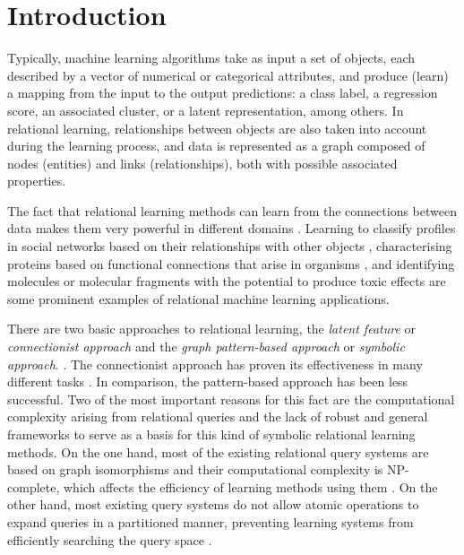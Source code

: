 \documentclass{article}%
\begin{document}
%
\normalsize%
\clearpage%
\section{Introduction}

Typically, machine learning algorithms take as input a set of objects, each described by a vector of numerical or categorical attributes, and produce (learn) a mapping from the input to the output predictions: a class label, a regression score, an associated cluster, or a latent representation, among others. In relational learning, relationships between objects are also taken into account during the learning process, and data is represented as a graph composed of nodes (entities) and links (relationships), both with possible associated properties.

The fact that relational learning methods can learn from the connections between data makes them very powerful in different domains \citep{Jacob:2014:LLR:2556195.2556225,webscale,6802366,lee2023conditional}. Learning to classify profiles in social networks based on their relationships with other objects \citep{tang2009relational,fan_2012}, characterising proteins based on functional connections that arise in organisms \citep{10.1007/978-3-642-23038-7_12}, and identifying molecules or molecular fragments with the potential to produce toxic effects \citep{camacho2011relational} are some prominent examples of relational machine learning applications.

There are two basic approaches to relational learning, the \textit{latent feature} or \textit{connectionist approach} and the \textit{ graph pattern-based approach} or \textit{symbolic approach}. \citep{de_raedt_2021}. The connectionist approach has proven its effectiveness in many different tasks \citep{kazemi2018relational,wu2022graph,zhou2020graph,ahmed2023adalnn,pacheco2021modeling,wang2020nodeaug}. In comparison, the pattern-based approach has been less successful. Two of the most important reasons for this fact are the computational complexity arising from relational queries and the lack of robust and general frameworks to serve as a basis for this kind of symbolic relational learning methods. On the one hand, most of the existing relational query systems are based on graph isomorphisms and their computational complexity is NP-complete, which affects the efficiency of learning methods using them \citep{latouche2015graphs}. On the other hand, most existing query systems do not allow atomic operations to expand queries in a partitioned manner, preventing learning systems from efficiently searching the query space \citep{Knobbe99multi-relationaldecision}. 
\end{document}
